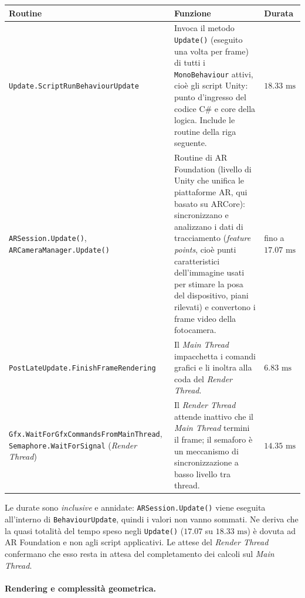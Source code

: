 \begin{center}
\small
\begin{tabular}{|p{4.4cm}|p{6.8cm}|p{2.6cm}|}
\hline
\textbf{Routine} & \textbf{Funzione} & \textbf{Durata} \\
\hline
\texttt{Update.\allowbreak ScriptRun\allowbreak Behaviour\allowbreak Update} & Invoca il metodo \texttt{Update()} (eseguito una volta per frame) di tutti i \texttt{MonoBehaviour} attivi, cioè gli script Unity: punto d'ingresso del codice C\# e core della logica. Include le routine della riga seguente. & $18.33\text{ ms}$ \\
\hline
\texttt{ARSession.\allowbreak Update()}, \texttt{ARCameraManager.\allowbreak Update()} & Routine di AR Foundation (livello di Unity che unifica le piattaforme AR, qui basato su ARCore): sincronizzano e analizzano i dati di tracciamento (\textit{feature points}, cioè punti caratteristici dell'immagine usati per stimare la posa del dispositivo, piani rilevati) e convertono i frame video della fotocamera. & fino a $17.07\text{ ms}$ \\
\hline
\texttt{PostLate\allowbreak Update.\allowbreak Finish\allowbreak Frame\allowbreak Rendering} & Il \textit{Main Thread} impacchetta i comandi grafici e li inoltra alla coda del \textit{Render Thread}. & $6.83\text{ ms}$ \\
\hline
\texttt{Gfx.WaitForGfx\allowbreak Commands\allowbreak From\allowbreak MainThread}, \texttt{Semaphore.\allowbreak WaitFor\allowbreak Signal} (\textit{Render Thread}) & Il \textit{Render Thread} attende inattivo che il \textit{Main Thread} termini il frame; il semaforo è un meccanismo di sincronizzazione a basso livello tra thread. & $14.35\text{ ms}$ \\
\hline
\end{tabular}
\end{center}

Le durate sono \textit{inclusive} e annidate: \texttt{ARSession.Update()} viene eseguita all'interno di \texttt{BehaviourUpdate}, quindi i valori non vanno sommati. Ne deriva che la quasi totalità del tempo speso negli \texttt{Update()} ($17.07$ su $18.33\text{ ms}$) è dovuta ad AR Foundation e non agli script applicativi. Le attese del \textit{Render Thread} confermano che esso resta in attesa del completamento dei calcoli sul \textit{Main Thread}.

\paragraph{Rendering e complessità geometrica.} 

